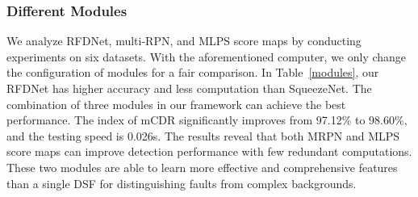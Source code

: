 \subsubsection{Different Modules}
We analyze RFDNet, multi-RPN, and MLPS score maps by conducting experiments on six datasets. With the aforementioned computer, we only change the configuration of modules for a fair comparison. In Table~\ref{modules}, our RFDNet has higher accuracy and less computation than SqueezeNet. The combination of three modules in our framework can achieve the best performance. The index of mCDR significantly improves from 97.12\% to 98.60\%, and the testing speed is 0.026s. The results reveal that both MRPN and MLPS score maps can improve detection performance with few redundant computations. These two modules are able to learn more effective and comprehensive features than a single DSF for distinguishing faults from complex backgrounds.

